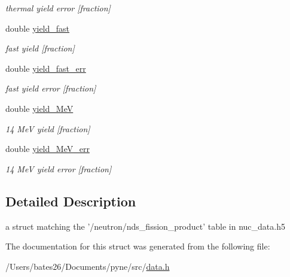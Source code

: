 \begin{DoxyCompactItemize}
\begin{DoxyCompactList}\small\item\em thermal yield error \mbox{[}fraction\mbox{]} \end{DoxyCompactList}\item 
\hypertarget{structpyne_1_1ndsfpy_ae890b10d182d771d0837b24818040a25}{double \hyperlink{structpyne_1_1ndsfpy_ae890b10d182d771d0837b24818040a25}{yield\+\_\+fast}}\label{structpyne_1_1ndsfpy_ae890b10d182d771d0837b24818040a25}

\begin{DoxyCompactList}\small\item\em fast yield \mbox{[}fraction\mbox{]} \end{DoxyCompactList}\item 
\hypertarget{structpyne_1_1ndsfpy_a0e2478bc6cbf2317861727a88cb8370b}{double \hyperlink{structpyne_1_1ndsfpy_a0e2478bc6cbf2317861727a88cb8370b}{yield\+\_\+fast\+\_\+err}}\label{structpyne_1_1ndsfpy_a0e2478bc6cbf2317861727a88cb8370b}

\begin{DoxyCompactList}\small\item\em fast yield error \mbox{[}fraction\mbox{]} \end{DoxyCompactList}\item 
\hypertarget{structpyne_1_1ndsfpy_a5e67e99b97b5ca511ca39c6dcd4b186e}{double \hyperlink{structpyne_1_1ndsfpy_a5e67e99b97b5ca511ca39c6dcd4b186e}{yield\+\_\+Me\+V}}\label{structpyne_1_1ndsfpy_a5e67e99b97b5ca511ca39c6dcd4b186e}

\begin{DoxyCompactList}\small\item\em 14 Me\+V yield \mbox{[}fraction\mbox{]} \end{DoxyCompactList}\item 
\hypertarget{structpyne_1_1ndsfpy_a1d24f4162fe242108b8032f76171d7e5}{double \hyperlink{structpyne_1_1ndsfpy_a1d24f4162fe242108b8032f76171d7e5}{yield\+\_\+Me\+V\+\_\+err}}\label{structpyne_1_1ndsfpy_a1d24f4162fe242108b8032f76171d7e5}

\begin{DoxyCompactList}\small\item\em 14 Me\+V yield error \mbox{[}fraction\mbox{]} \end{DoxyCompactList}\end{DoxyCompactItemize}


\subsection{Detailed Description}
a struct matching the '/neutron/nds\+\_\+fission\+\_\+product' table in nuc\+\_\+data.\+h5 

The documentation for this struct was generated from the following file\+:\begin{DoxyCompactItemize}
\item 
/\+Users/bates26/\+Documents/pyne/src/\hyperlink{data_8h}{data.\+h}\end{DoxyCompactItemize}
